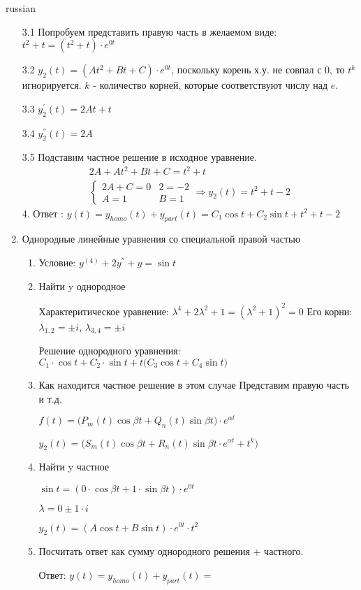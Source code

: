 \documentclass{article}
\begin{document}
\begin{otherlanguage*}{russian}
\begin{enumerate}
3.1 Попробуем представить правую часть в желаемом виде: $t^2 + t = (t^2 + t) \cdot e ^ {0t} $

3.2 $ y_2(t) = (A t ^ 2 + Bt + C) \cdot e ^{0t} $, поскольку корень х.у. не совпал с 0, то $t^k$ игнорируется. $ k $ - количество корней, которые соответствуют числу над $e$.  

3.3 $ y ^ {'}_2 (t) = 2 At + t$

3.4 $ y^{''}_2 (t) = 2 A  $

3.5 Подставим частное решение в исходное уравнение. 
\begin{align}
2 A + A t ^ 2 + Bt + C = t ^ 2 + t \\
\begin{cases}
2 A + C = 0 & 2 = - 2 \\
A = 1 & B = 1 
\end{cases} \Rightarrow y_2 (t) = t ^ 2 + t - 2 
\end{align}
4. Ответ : $ y(t) = y_{homo} (t) + y_{part} (t) = C_1 \cos t + C_2 \sin t + t ^ 2 + t - 2 $

\item Однородные линейные уравнения со специальной правой частью 

\begin{enumerate}
\item Условие: $y^{(4)} + 2 y ^{''} + y = \sin t $ 

\item Найти y однородное 

Характеритическое уравнение: $ \lambda ^ 4 + 2 \lambda ^ 2 + 1 = (\lambda ^ 2 + 1) ^ 2 = 0 $
Его корни: $\lambda_{1, 2} = \pm i$, $\lambda_{3, 4} = \pm i$ 

Решение однородного уравнения: $ C_1 \cdot \cos t + C_2 \cdot \sin t + t \big( C_3 \cos t + C_4 \sin t \big)$  

\item Как находится частное решение в этом случае
Представим правую часть и т.д.

$ f(t) = \big( P_m(t) \cos \beta t + Q_n(t) \sin \beta t \big) \cdot e ^{\alpha t} $

$ y_2(t) = \big( S_m (t) \cos \beta t + R_n (t) \sin \beta t \cdot e^{\alpha t} + t^k \big)$

\item Найти y частное

$ \sin t = ( 0 \cdot \cos \beta t + 1 \cdot \sin \beta t) \cdot e ^{0 t}$

$ \lambda = 0 \pm 1 \cdot i $

$ y_2 (t) = (A \cos t + B \sin t) \cdot e ^ {0 t} \cdot t ^ 2 $

\item Посчитать ответ как сумму однородного решения + частного. 

Ответ: $ y(t) = y_{homo} (t) + y_{part} (t) = $
\end{enumerate}
\end{enumerate}
\end{otherlanguage*}
\end{document}
